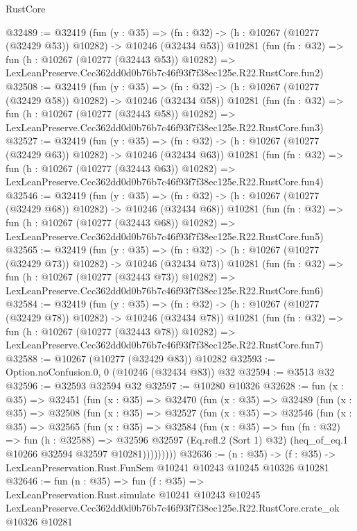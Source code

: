 \begin{lexlean}{RustCore}
\begin{coremodule}
@32489 := @32419
    (fun (y : @35) =>
    (fn : @32) -> (h : @10267 (@10277 (@32429 @53)) @10282) -> @10246 (@32434 @53))
    @10281
    (fun (fn : @32) =>
    fun (h : @10267 (@10277 (@32443 @53)) @10282) =>
    LexLeanPreserve.Ccc362dd0d0b76b7c46f93f7f38ec125e.R22.RustCore.fun2)
@32508 := @32419
    (fun (y : @35) =>
    (fn : @32) -> (h : @10267 (@10277 (@32429 @58)) @10282) -> @10246 (@32434 @58))
    @10281
    (fun (fn : @32) =>
    fun (h : @10267 (@10277 (@32443 @58)) @10282) =>
    LexLeanPreserve.Ccc362dd0d0b76b7c46f93f7f38ec125e.R22.RustCore.fun3)
@32527 := @32419
    (fun (y : @35) =>
    (fn : @32) -> (h : @10267 (@10277 (@32429 @63)) @10282) -> @10246 (@32434 @63))
    @10281
    (fun (fn : @32) =>
    fun (h : @10267 (@10277 (@32443 @63)) @10282) =>
    LexLeanPreserve.Ccc362dd0d0b76b7c46f93f7f38ec125e.R22.RustCore.fun4)
@32546 := @32419
    (fun (y : @35) =>
    (fn : @32) -> (h : @10267 (@10277 (@32429 @68)) @10282) -> @10246 (@32434 @68))
    @10281
    (fun (fn : @32) =>
    fun (h : @10267 (@10277 (@32443 @68)) @10282) =>
    LexLeanPreserve.Ccc362dd0d0b76b7c46f93f7f38ec125e.R22.RustCore.fun5)
@32565 := @32419
    (fun (y : @35) =>
    (fn : @32) -> (h : @10267 (@10277 (@32429 @73)) @10282) -> @10246 (@32434 @73))
    @10281
    (fun (fn : @32) =>
    fun (h : @10267 (@10277 (@32443 @73)) @10282) =>
    LexLeanPreserve.Ccc362dd0d0b76b7c46f93f7f38ec125e.R22.RustCore.fun6)
@32584 := @32419
    (fun (y : @35) =>
    (fn : @32) -> (h : @10267 (@10277 (@32429 @78)) @10282) -> @10246 (@32434 @78))
    @10281
    (fun (fn : @32) =>
    fun (h : @10267 (@10277 (@32443 @78)) @10282) =>
    LexLeanPreserve.Ccc362dd0d0b76b7c46f93f7f38ec125e.R22.RustCore.fun7)
@32588 := @10267 (@10277 (@32429 @83)) @10282
@32593 := Option.noConfusion.{0, 0} (@10246 (@32434 @83)) @32
@32594 := @3513 @32
@32596 := @32593 @32594 @32
@32597 := @10280 @10326
@32628 := fun (x : @35) =>
  @32451
    (fun (x : @35) =>
    @32470
      (fun (x : @35) =>
      @32489
        (fun (x : @35) =>
        @32508
          (fun (x : @35) =>
          @32527
            (fun (x : @35) =>
            @32546
              (fun (x : @35) =>
              @32565
                (fun (x : @35) =>
                @32584
                  (fun (x : @35) =>
                  fun (fn : @32) =>
                  fun (h : @32588) =>
                  @32596
                    @32597
                    (Eq.refl.{2} (Sort 1) @32)
                    (heq_of_eq.{1} @10266 @32594 @32597 @10281)))))))))
@32636 := (n : @35) ->
  (f : @35) -> LexLeanPreservation.Rust.FunSem @10241 @10243 @10245 @10326 @10281
@32646 := fun (n : @35) =>
  fun (f : @35) =>
  LexLeanPreservation.Rust.simulate
    @10241
    @10243
    @10245
    LexLeanPreserve.Ccc362dd0d0b76b7c46f93f7f38ec125e.R22.RustCore.crate_ok
    @10326
    @10281
\end{coremodule}
\end{lexlean}
